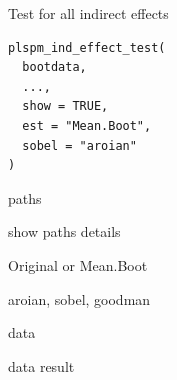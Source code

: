 \documentclass[a4paper]{book}
\begin{document}
%
\begin{Description}
Test for all indirect effects
\end{Description}
%
\begin{Usage}
\begin{verbatim}
plspm_ind_effect_test(
  bootdata,
  ...,
  show = TRUE,
  est = "Mean.Boot",
  sobel = "aroian"
)
\end{verbatim}
\end{Usage}
%
\begin{Arguments}
\begin{ldescription}
\item[\code{...}] paths

\item[\code{show}] show paths details

\item[\code{est}] Original or Mean.Boot

\item[\code{sobel}] aroian, sobel, goodman

\item[\code{bootdataboot}] data
\end{ldescription}
\end{Arguments}
%
\begin{Value}
data result
\end{Value}
%
\end{document}
